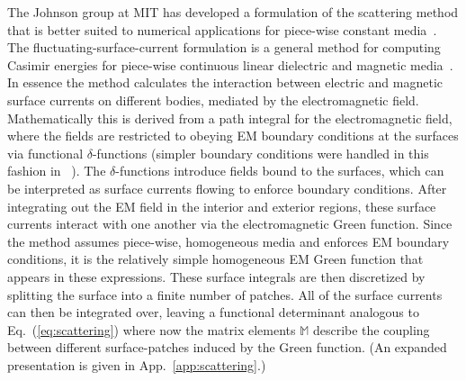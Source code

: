 The Johnson group at MIT has developed a formulation of the scattering method that is better suited to numerical 
applications for piece-wise constant media~\cite{Rodriguez2007,Rodriguez2007a, Rodriguez2009,Reid2009,Reid2011, Reid2013}.  
The fluctuating-surface-current formulation is a general method for computing Casimir
energies for piece-wise continuous linear dielectric and magnetic media~\cite{Reid2009,Reid2011, Reid2013}.  
In essence the method calculates the interaction between electric and magnetic surface currents 
on different bodies, mediated by the electromagnetic field.  Mathematically this is derived 
from a path integral for the electromagnetic field, where the fields are restricted to obeying EM boundary conditions at the 
surfaces via functional $\delta$-functions (simpler boundary conditions were handled in this fashion in
~\cite{Bordag1985,Li1991}).  The $\delta$-functions introduce fields 
bound to the surfaces, which can be interpreted as surface currents flowing to enforce boundary conditions.
After integrating out the EM field in the interior and exterior regions, 
these surface currents interact with one another via the electromagnetic Green function.
Since the method assumes piece-wise, homogeneous media and enforces EM boundary
conditions, it is the relatively simple homogeneous EM Green function that appears in these expressions.
These surface integrals are then discretized by splitting the surface into a finite number of patches.
All of the surface currents can then be integrated over, leaving a functional determinant analogous to Eq.~(\ref{eq:scattering})
where now the matrix elements $\mathbb{M}$ describe the coupling between different surface-patches induced
by the Green function.  (An expanded presentation is given in App.~\ref{app:scattering}.)

